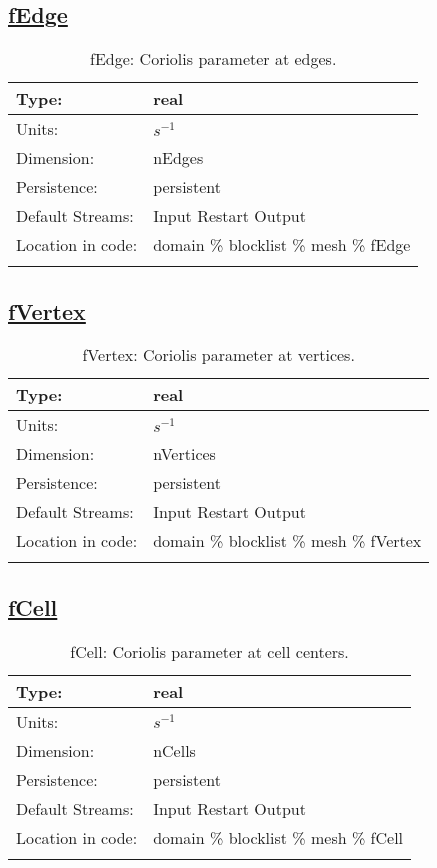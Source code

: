\subsection[fEdge]{\hyperref[sec:var_tab_mesh]{fEdge}}
\label{subsec:var_sec_mesh_fEdge}
\begin{center}
\begin{longtable}{| p{2.0in} | p{4.0in} |}
        \hline 
        Type: & real \\
        \hline 
        Units: & $s^{-1}$ \\
        \hline 
        Dimension: & nEdges \\
        \hline 
        Persistence: & persistent \\
        \hline 
		 Default Streams: & Input Restart Output  \\
        \hline 
		 Location in code: & domain \% blocklist \% mesh \% fEdge \\
		 \hline 
    \caption{fEdge: Coriolis parameter at edges.}
\end{longtable}
\end{center}
\subsection[fVertex]{\hyperref[sec:var_tab_mesh]{fVertex}}
\label{subsec:var_sec_mesh_fVertex}
\begin{center}
\begin{longtable}{| p{2.0in} | p{4.0in} |}
        \hline 
        Type: & real \\
        \hline 
        Units: & $s^{-1}$ \\
        \hline 
        Dimension: & nVertices \\
        \hline 
        Persistence: & persistent \\
        \hline 
		 Default Streams: & Input Restart Output  \\
        \hline 
		 Location in code: & domain \% blocklist \% mesh \% fVertex \\
		 \hline 
    \caption{fVertex: Coriolis parameter at vertices.}
\end{longtable}
\end{center}
\subsection[fCell]{\hyperref[sec:var_tab_mesh]{fCell}}
\label{subsec:var_sec_mesh_fCell}
\begin{center}
\begin{longtable}{| p{2.0in} | p{4.0in} |}
        \hline 
        Type: & real \\
        \hline 
        Units: & $s^{-1}$ \\
        \hline 
        Dimension: & nCells \\
        \hline 
        Persistence: & persistent \\
        \hline 
		 Default Streams: & Input Restart Output  \\
        \hline 
		 Location in code: & domain \% blocklist \% mesh \% fCell \\
		 \hline 
    \caption{fCell: Coriolis parameter at cell centers.}
\end{longtable}
\end{center}
